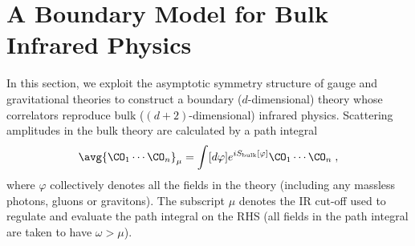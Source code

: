 \documentclass[11pt]{article}
\def\o{{\omega}}
\begin{document}
\section{A Boundary Model for Bulk Infrared Physics}\label{sec:Actions}

In this section, we exploit the asymptotic symmetry structure of gauge and gravitational theories to construct a boundary ($d$-dimensional) theory whose correlators reproduce bulk ($(d+2)$-dimensional) infrared physics. Scattering amplitudes in the bulk theory are calculated by a path integral 
\begin{equation}
\begin{split}
\avg{ \CO_1 \cdots \CO_n }_\mu = \int [d \varphi ] e^{i S_{\text{bulk}} [ \varphi ] } \CO_1 \cdots \CO_n \; ,
\end{split}
\end{equation}
where $\varphi$ collectively denotes all the fields in the theory (including any massless photons, gluons or gravitons). The subscript $\mu$ denotes the IR cut-off used to regulate and evaluate the path integral on the RHS (all fields in the path integral are taken to have $\o > \mu$).
\end{document}
